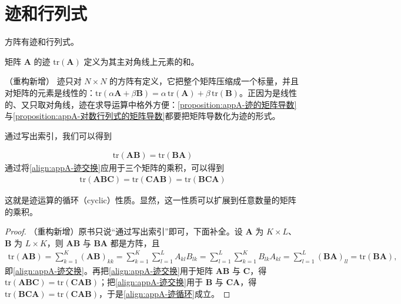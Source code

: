 \documentclass[../main.tex]{subfiles}
\begin{document}
\section{迹和行列式}\label{section:appA-迹和行列式}

方阵有迹和行列式。

\begin{definition}[迹]\label{definition:appA-迹}
矩阵 $\bm{A}$ 的迹 $\mathrm{tr}(\bm{A})$ 定义为其主对角线上元素的和。
\end{definition}

\begin{remark}（重构新增）
迹只对 $N\times N$ 的方阵有定义，它把整个矩阵压缩成一个标量，并且对矩阵的元素是线性的：$\mathrm{tr}(\alpha\bm{A}+\beta\bm{B})=\alpha\,\mathrm{tr}(\bm{A})+\beta\,\mathrm{tr}(\bm{B})$。正因为是线性的、又只取对角线，迹在求导运算中格外方便：\cref{proposition:appA-迹的矩阵导数}与\cref{proposition:appA-对数行列式的矩阵导数}都要把矩阵导数化为迹的形式。
\end{remark}

通过写出索引，我们可以得到
\begin{proposition}[迹的循环性]\label{proposition:appA-迹的循环性}
\begin{align}
  \mathrm{tr}(\bm{A}\bm{B})=\mathrm{tr}(\bm{B}\bm{A})
  \label{align:appA-迹交换}
\end{align}
通过将\eqref{align:appA-迹交换}应用于三个矩阵的乘积，可以得到
\begin{align}
  \mathrm{tr}(\bm{A}\bm{B}\bm{C})=\mathrm{tr}(\bm{C}\bm{A}\bm{B})=\mathrm{tr}(\bm{B}\bm{C}\bm{A})
  \label{align:appA-迹循环}
\end{align}
\end{proposition}

这就是迹运算的循环（cyclic）性质。显然，这一性质可以扩展到任意数量的矩阵的乘积。

\begin{proof}
（重构新增）原书只说“通过写出索引”即可，下面补全。设 $\bm{A}$ 为 $K\times L$、$\bm{B}$ 为 $L\times K$，则 $\bm{A}\bm{B}$ 与 $\bm{B}\bm{A}$ 都是方阵，且
\begin{align*}
  \mathrm{tr}(\bm{A}\bm{B})=\sum_{k=1}^{K}(\bm{A}\bm{B})_{kk}=\sum_{k=1}^{K}\sum_{l=1}^{L}A_{kl}B_{lk}=\sum_{l=1}^{L}\sum_{k=1}^{K}B_{lk}A_{kl}=\sum_{l=1}^{L}(\bm{B}\bm{A})_{ll}=\mathrm{tr}(\bm{B}\bm{A}),
\end{align*}
即\eqref{align:appA-迹交换}。再把\eqref{align:appA-迹交换}用于矩阵 $\bm{A}\bm{B}$ 与 $\bm{C}$，得 $\mathrm{tr}(\bm{A}\bm{B}\bm{C})=\mathrm{tr}(\bm{C}\bm{A}\bm{B})$；把\eqref{align:appA-迹交换}用于 $\bm{B}$ 与 $\bm{C}\bm{A}$，得 $\mathrm{tr}(\bm{B}\bm{C}\bm{A})=\mathrm{tr}(\bm{C}\bm{A}\bm{B})$，于是\eqref{align:appA-迹循环}成立。
\end{proof}
\end{document}
